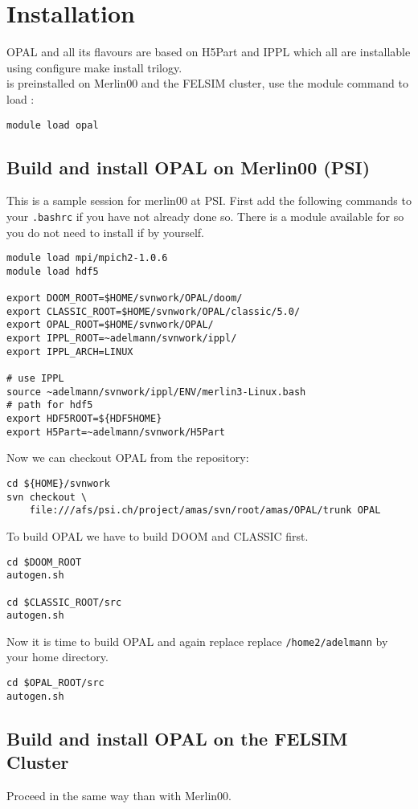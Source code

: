 \chapter{Installation}
\label{sec:installation}
OPAL and all its flavours are based on H5Part and IPPL which all are installable using configure make install trilogy. \\
\opal is preinstalled on Merlin00 and the FELSIM cluster, use the module command to load \opal: 
\begin{verbatim}
module load opal
\end{verbatim}


\section{Build and install OPAL on Merlin00 (PSI)}
This is a sample session for merlin00 at PSI. First add the following commands to your {\tt .bashrc} if
you have not already  done so. There is a module available for \opal so you do not 
need to install if by yourself. 
\begin{verbatim}
module load mpi/mpich2-1.0.6
module load hdf5

export DOOM_ROOT=$HOME/svnwork/OPAL/doom/
export CLASSIC_ROOT=$HOME/svnwork/OPAL/classic/5.0/
export OPAL_ROOT=$HOME/svnwork/OPAL/
export IPPL_ROOT=~adelmann/svnwork/ippl/
export IPPL_ARCH=LINUX

# use IPPL 
source ~adelmann/svnwork/ippl/ENV/merlin3-Linux.bash
# path for hdf5
export HDF5ROOT=${HDF5HOME}
export H5Part=~adelmann/svnwork/H5Part
\end{verbatim}
Now we can checkout OPAL from the repository: 
\begin{verbatim}
cd ${HOME}/svnwork
svn checkout \
    file:///afs/psi.ch/project/amas/svn/root/amas/OPAL/trunk OPAL
\end{verbatim}
To build OPAL we have to build DOOM and CLASSIC first.
\begin{verbatim}
cd $DOOM_ROOT
autogen.sh

cd $CLASSIC_ROOT/src
autogen.sh
\end{verbatim}
Now it is time to build OPAL and again replace replace {\tt /home2/adelmann} by your home directory.
\begin{verbatim}
cd $OPAL_ROOT/src
autogen.sh
\end{verbatim}

\section{Build and install OPAL on the FELSIM Cluster}
Proceed in the same way than with Merlin00.

